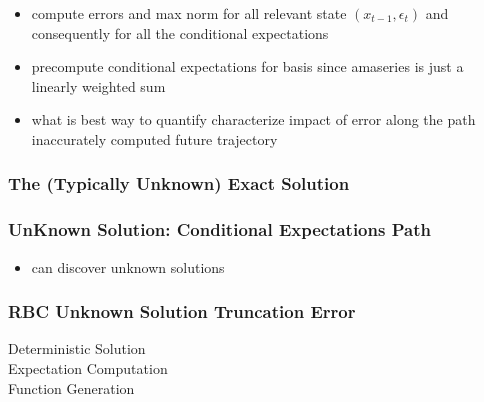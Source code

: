 \documentclass[tikz]{beamer}
\begin{document}
\begin{frame}
  \begin{itemize}
  \item compute errors and max norm for all relevant state $(x_{t-1},\epsilon_t)$ and consequently for all the conditional expectations
  \item precompute  conditional expectations for basis since amaseries is
just a linearly weighted sum
\item what is best way to quantify characterize impact of error along the path
inaccurately computed future trajectory
  \end{itemize}
\end{frame}

\subsubsection{The (Typically Unknown) Exact Solution}



\begin{frame}
\frametitle{UnKnown Solution: Conditional Expectations Path}
\begin{itemize}
\item can discover unknown solutions
\end{itemize}



\end{frame}




\begin{frame}
  \frametitle{RBC Unknown Solution Truncation Error }
  \begin{description}
  \item[Deterministic Solution] 
  \item[Expectation Computation] 
\item[Function Generation]
  \end{description}

\end{frame}
\end{document}
